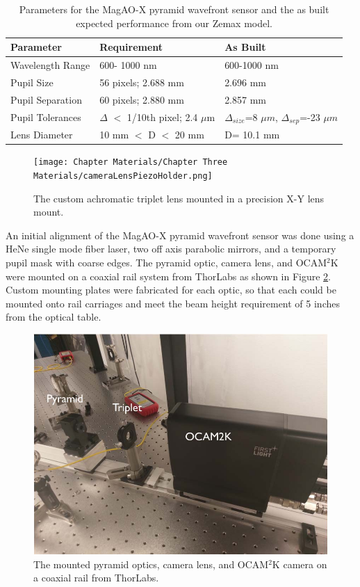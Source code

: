 	
\begin{table}
	\begin{center}
		\begin{tabular}{ | l| l |  l |}
			\hline
			\textbf{Parameter}& \textbf{Requirement} & \textbf{As Built}\\ \hline
			Wavelength Range &600- 1000 nm& 600-1000 nm\\ \hline
			Pupil Size & 56 pixels; 2.688 mm& 2.696 mm\\ \hline
			Pupil Separation & 60 pixels; 2.880 mm& 2.857 mm \\ \hline
			Pupil Tolerances & $\Delta$ $<$ 1/10th pixel; 2.4 $\mu$m& $\Delta_{size}$=8 $\mu m$,  $\Delta_{sep}$=-23 $\mu m$ \\ \hline
			Lens Diameter & 10 mm $<$ D  $<$ 20 mm & D= 10.1 mm\\ \hline
				
		\end{tabular}
	\end{center}
	\caption{Parameters for the MagAO-X pyramid wavefront sensor and the as built expected performance from our Zemax model.}
	\label{tab:asbuilt}
\end{table}



\begin{figure}
    \centering
    \texttt{[image: Chapter Materials/Chapter Three Materials/cameraLensPiezoHolder.png]}
    \caption{The custom achromatic triplet lens mounted in a precision X-Y lens mount.}
    \label{fig:mountedtriplet}
\end{figure}
	
An initial alignment of the MagAO-X pyramid wavefront sensor was done using a HeNe single mode fiber laser, two off axis parabolic mirrors, and a temporary pupil mask with coarse edges. The pyramid optic, camera lens, and OCAM$^2$K were mounted on a coaxial rail system from ThorLabs as shown in Figure \ref{fig:mountedPWFS}. Custom mounting plates were fabricated for each optic, so that each could be mounted onto rail carriages and meet the beam height requirement of 5 inches from the optical table. 

\begin{figure}
    \centering
    \includegraphics[width=.8\textwidth]{Chapter Materials/Chapter Three Materials/mountedPWFS.jpg}
    \caption{The mounted pyramid optics, camera lens, and OCAM$^2$K camera on a coaxial rail from ThorLabs.}
    \label{fig:mountedPWFS}
\end{figure}

